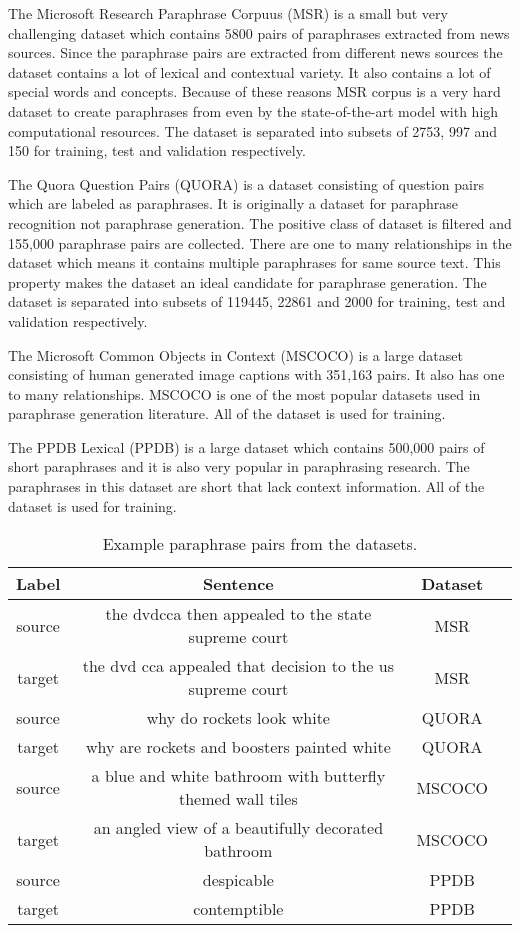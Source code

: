 The Microsoft Research Paraphrase Corpuus (MSR) \cite{msrp} is a small but very challenging dataset which contains 5800 pairs of paraphrases extracted from news sources. Since the paraphrase pairs are extracted from different news sources the dataset contains a lot of lexical and contextual variety. It also contains a lot of special words and concepts. Because of these reasons MSR corpus is a very hard dataset to create paraphrases from even by the state-of-the-art model with high computational resources. The dataset is separated into subsets of 2753, 997 and 150 for training, test and validation respectively.

The Quora Question Pairs (QUORA) is a dataset consisting of question pairs which are labeled as paraphrases. It is originally a dataset for paraphrase recognition not paraphrase generation. The positive class of dataset is filtered and 155,000 paraphrase pairs are collected. There are one to many relationships in the dataset which means it contains multiple paraphrases for same source text. This property makes the dataset an ideal candidate for paraphrase generation. The dataset is separated into subsets of 119445, 22861 and 2000 for training, test and validation respectively.

The Microsoft Common Objects in Context (MSCOCO) \cite{mscoco} is a large dataset consisting of human generated image captions with 351,163 pairs. It also has one to many relationships. MSCOCO is one of the most popular datasets used in paraphrase generation literature. All of the dataset is used for training.

The PPDB Lexical (PPDB) \cite{ppdb} is a large dataset which contains 500,000 pairs of short paraphrases and it is also very popular in paraphrasing research. The paraphrases in this dataset are short that lack context information. All of the dataset is used for training.

\begin{table}
\small
 \begin{tabular}{||c c c c||} 
 \hline
 Label & Sentence & Dataset & \\ [0.5ex] 
 \hline
 source & the dvdcca then appealed to the state supreme court & MSR & \\
 \hline
 target & the dvd cca appealed that decision to the us supreme court & MSR & \\
  \hline
 source & why do rockets look white & QUORA & \\
 \hline
 target & why are rockets and boosters painted white & QUORA & \\
 \hline
 source & a blue and white bathroom with butterfly themed wall tiles & MSCOCO & \\
 \hline
 target & an angled view of a beautifully decorated bathroom & MSCOCO & \\
 \hline
 source & despicable & PPDB & \\
 \hline
 target & contemptible & PPDB & \\
 \hline
\end{tabular}
\caption{Example paraphrase pairs from the datasets.}
\end{table}


